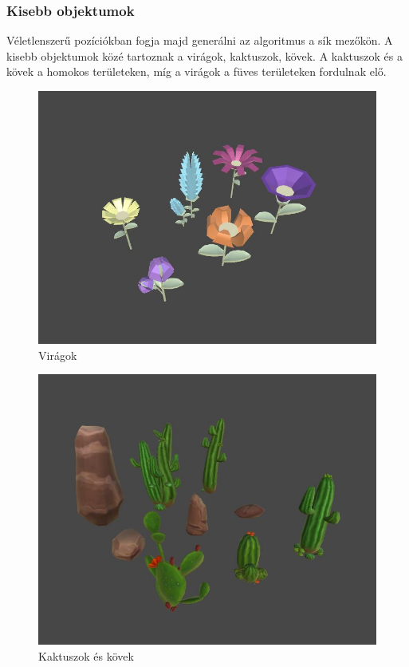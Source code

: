
\newpage
\subsubsection{Kisebb objektumok}

Véletlenszerű pozíciókban fogja majd generálni az algoritmus a sík mezőkön. A kisebb objektumok közé tartoznak a virágok, kaktuszok, kövek. A kaktuszok és a kövek a homokos területeken, míg a virágok a füves területeken fordulnak elő. 

\begin{figure}[h!]
\centering
\includegraphics[scale=0.4]{kepek/Flowers.JPG}
\caption[Virágok]{Virágok \footnotemark}
\label{fig:Flowers}
\end{figure}


\begin{figure}[h!]
\centering
\includegraphics[scale=0.4]{kepek/Cactus.JPG}
\caption[Kaktuszok és kövek]{Kaktuszok és kövek \footnotemark} 
\label{fig:Cactus}
\end{figure}

